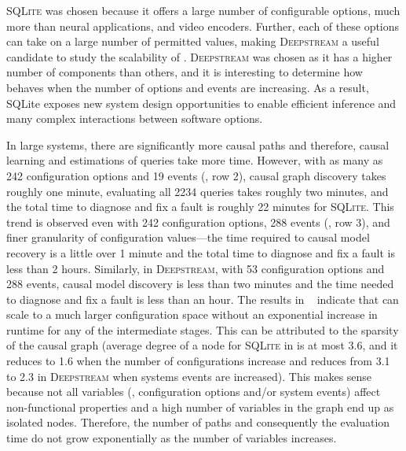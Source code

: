  
\textsc{SQLite} was chosen because it offers a large number of configurable options, much more than neural applications, and video encoders. Further, each of these options can take on a large number of permitted values, making \textsc{Deepstream} a useful candidate to study the scalability of \ourapproach. \textsc{Deepstream} was chosen as it has a higher number of components than others, and it is interesting to determine how \ourapproach behaves when the number of options and events are increasing. As a result, SQLite exposes new system design opportunities to enable efficient inference and many complex interactions between software options. 


In large systems, there are significantly more causal paths and therefore, causal learning and estimations of queries take more time. However, with as many as 242 configuration options and 19 events (, row 2), causal graph discovery takes roughly one minute, evaluating all 2234 queries takes roughly two minutes, and the total time to diagnose and fix a fault is roughly 22 minutes for \textsc{SQLite}. This trend is observed even with 242 configuration options, 288 events (, row 3), and finer granularity of configuration values---the time required to causal model recovery is a little over 1 minute and the total time to diagnose and fix a fault is less than 2 hours. Similarly, in \textsc{Deepstream}, with 53 configuration options and 288 events, causal model discovery is less than two minutes and the time needed to diagnose and fix a fault is less than an hour. 
The results in ~ indicate that \ourapproach can scale to a much larger configuration space without an exponential increase in runtime for any of the intermediate stages. This can be attributed to the sparsity of the causal graph (average degree of a node for \textsc{SQLite} in  is at most 3.6, and it reduces to 1.6 when the number of configurations increase and reduces from 3.1 to 2.3 in \textsc{Deepstream} when systems events are increased). This makes sense because not all variables (\ie, configuration options and/or system events) affect non-functional properties and a high number of variables in the graph end up as isolated nodes. Therefore, the number of paths and consequently the evaluation time do not grow exponentially as the number of variables increases.


